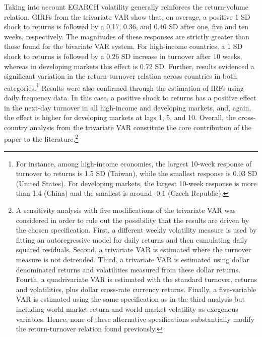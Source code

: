 \documentclass[final,3p,times,twocolumn]{elsarticle}
\begin{document}
Taking into account EGARCH volatility generally reinforces the return-volume relation. GIRFs from the trivariate VAR show that, on average, a positive 1 SD shock to returns is followed by a 0.17, 0.36, and 0.46 SD after one, five and ten weeks, respectively. The magnitudes of these responses are strictly greater than those found for the bivariate VAR system. For high-income countries, a 1 SD shock to returns is followed by a 0.26 SD increase in turnover after 10 weeks, whereas in developing markets this effect is 0.72 SD. Further, results evidenced a significant variation in the return-turnover relation across countries in both categories.\footnote{For instance, among  high-income economies, the largest 10-week response of turnover to returns is 1.5 SD (Taiwan), while the smallest response is 0.03 SD (United States). For developing markets, the largest 10-week response is more than 1.4 (China) and the smallest is around -0.1 (Czech Republic).} Results were also confirmed through the estimation of IRFs using daily frequency data. In this case, a positive shock to returns has a positive effect in the next-day turnover in all high-income and developing markets, and, again, the effect is higher for developing markets at lags 1, 5, and 10. Overall, the cross-country analysis from the trivariate VAR constitute the core contribution of the paper to the literature.\footnote{A sensitivity analysis with five modifications of the trivariate VAR was considered in order to rule out the possibility that the results are driven by the chosen specification. First, a different weekly volatility measure is used by fitting an autoregressive model for daily returns and then cumulating daily squared residuals. Second, a trivariate VAR is estimated where the turnover measure is not detrended. Third, a trivariate VAR is estimated using dollar denominated returns and volatilities measured from these dollar returns. Fourth, a quadrivariate VAR is estimated with the standard turnover, returns and volatilities, plus dollar cross-rate currency returns. Finally, a five-variable VAR is estimated using the same specification as in the third analysis but including world market return and world market volatility as exogenous variables. Hence, none of these alternative specifications substantially modify the return-turnover relation found previously.}\par

\end{document}
